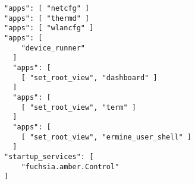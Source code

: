 \begin{verbatim}
"apps": [ "netcfg" ]
"apps": [ "thermd" ]
"apps": [ "wlancfg" ]
"apps": [
    "device_runner"
  ]
  "apps": [
    [ "set_root_view", "dashboard" ]
  ]
  "apps": [
    [ "set_root_view", "term" ]
  ]
  "apps": [
    [ "set_root_view", "ermine_user_shell" ]
  ]
"startup_services": [
    "fuchsia.amber.Control"
]

\end{verbatim}
